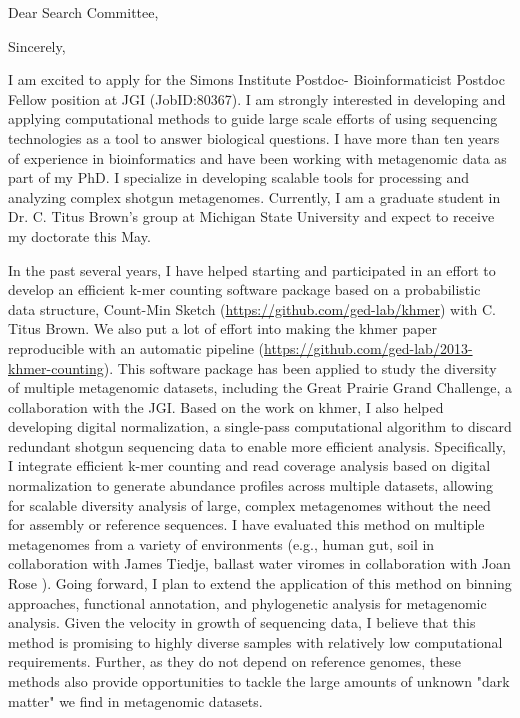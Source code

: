 \documentclass[10pt,a4paper,sans]{moderncv}        %
\begin{document}
\date{November 06, 2014}
\opening{Dear Search Committee,}
\closing{Sincerely,}
\makelettertitle

I am excited to apply for the Simons Institute Postdoc- Bioinformaticist Postdoc Fellow position at JGI (JobID:80367).  I am strongly interested in developing and applying computational methods to guide large scale efforts of using sequencing technologies as a tool to answer biological questions.  I have more than ten years of experience in bioinformatics and have been working with metagenomic data as part of my PhD.  I specialize in developing scalable tools for processing and analyzing complex shotgun metagenomes. Currently, I am a graduate student in Dr. C. Titus Brown's group at Michigan State University and expect to receive my doctorate this May.  

In the past several years, I have helped starting and participated in an effort to develop an efficient k-mer counting software package based on a probabilistic data structure, Count-Min Sketch  (\url{https://github.com/ged-lab/khmer}) with C. Titus Brown. We also put a lot of effort into making the khmer paper reproducible with an automatic pipeline (\url{https://github.com/ged-lab/2013-khmer-counting}). This software package has been applied to study the diversity of multiple metagenomic datasets, including the Great Prairie Grand Challenge, a collaboration with the JGI. Based on the work on khmer, I also helped developing digital normalization,  a single-pass computational algorithm to discard redundant shotgun sequencing data to enable more efficient analysis. Specifically, I integrate efficient k-mer counting and read coverage analysis based on digital normalization to generate abundance profiles across multiple datasets, allowing for scalable diversity analysis of large, complex metagenomes without the need for assembly or reference sequences.   I have evaluated this method on multiple metagenomes from a variety of environments (e.g., human gut, soil in collaboration with James Tiedje, ballast water viromes in collaboration with Joan Rose ). Going forward, I plan to extend the application of this method on binning approaches, functional annotation, and phylogenetic analysis for metagenomic analysis. Given the velocity in growth of sequencing data, I believe that this method is promising to highly diverse samples with relatively low computational requirements. Further, as they do not depend on reference genomes, these methods also provide opportunities to tackle the large amounts of unknown "dark matter" we find in metagenomic datasets.
\end{document}
